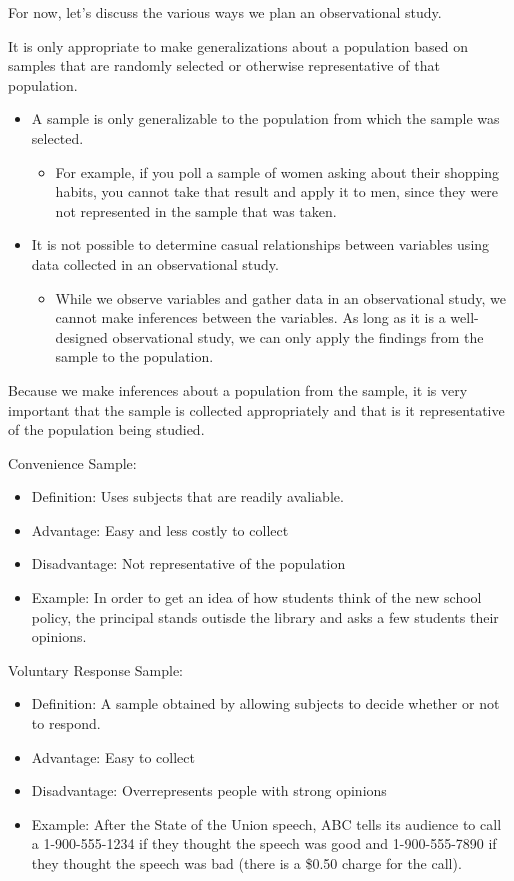 \documentclass[../stats.tex]{subfiles}
\begin{document}
For now, let's discuss the various ways we plan an observational study.

It is only appropriate to make generalizations about a population based on samples that are randomly selected or otherwise representative of that population.
\begin{itemize}
    \item A sample is only generalizable to the population from which the sample was selected.
    \begin{itemize}
        \item For example, if you poll a sample of women asking about their shopping habits, you cannot take that result and apply it to men, since they were not represented in the sample that was taken.
    \end{itemize}
    \item It is not possible to determine casual relationships between variables using data collected in an observational study.
    \begin{itemize}
        \item While we observe variables and gather data in an observational study, we cannot make inferences between the variables. As long as it is a well-designed observational study, we can only apply the findings from the sample to the population.
    \end{itemize}
\end{itemize}

Because we make inferences about a population from the sample, it is very important that the sample is collected appropriately and that is it representative of the population being studied.

Convenience Sample:
\begin{itemize}
    \item Definition: Uses subjects that are readily avaliable.
    \item Advantage: Easy and less costly to collect 
    \item Disadvantage: Not representative of the population 
    \item Example: In order to get an idea of how students think of the new school policy, the principal stands outisde the library and asks a few students their opinions.
\end{itemize}

Voluntary Response Sample:
\begin{itemize}
    \item Definition: A sample obtained by allowing subjects to decide whether or not to respond.
    \item Advantage: Easy to collect 
    \item Disadvantage: Overrepresents people with strong opinions 
    \item Example: After the State of the Union speech, ABC tells its audience to call a 1-900-555-1234 if they thought the speech was good and 1-900-555-7890 if they thought the speech was bad (there is a \$0.50 charge for the call).
\end{itemize}
\end{document}
